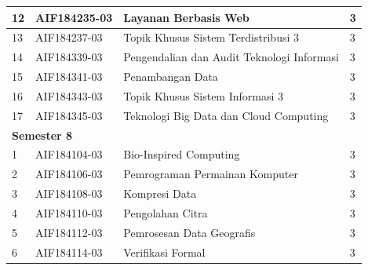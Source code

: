 \begin{table}[H]
\begin{tabular}{|p{0.5cm}|p{2.85cm}|p{4.95cm}|p{2.7cm}|}
			12  & AIF184235-03    & Layanan Berbasis Web                       & 3   \\ \hline
13  & AIF184237-03    & Topik Khusus Sistem Terdistribusi 3        & 3   \\ \hline
14  & AIF184339-03    & Pengendalian dan Audit Teknologi Informasi & 3   \\ \hline
15  & AIF184341-03    & Penambangan Data                           & 3   \\ \hline
16  & AIF184343-03    & Topik Khusus Sistem Informasi 3            & 3   \\ \hline
17  & AIF184345-03  & Teknologi Big Data dan Cloud Computing     & 3   \\ \hline
\multicolumn{4}{|l|}{\textbf{Semester 8}}                                \\ \hline
1   & AIF184104-03    & Bio-Inspired Computing                     & 3   \\ \hline
2   & AIF184106-03    & Pemrograman Permainan Komputer             & 3   \\ \hline
3   & AIF184108-03    & Kompresi Data                              & 3   \\ \hline
4   & AIF184110-03    & Pengolahan Citra                           & 3   \\ \hline
5   & AIF184112-03    & Pemrosesan Data Geografis                  & 3   \\ \hline
6   & AIF184114-03    & Verifikasi Formal                          & 3   \\ \hline
		\end{tabular}
	\label{tab:kuliahpilihan_2}
\end{table}

